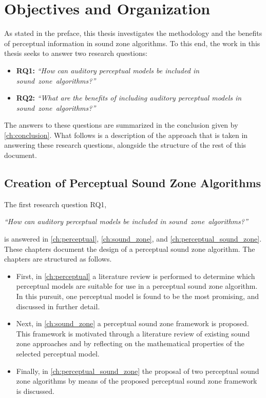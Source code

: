 \section{Objectives and Organization}
\label{ch:introduction:objectives}
As stated in the preface, this thesis investigates the methodology and 
the benefits of perceptual information in sound zone algorithms.
To this end, the work in this thesis seeks to answer two research questions:
\begin{itemize}
    \item \textbf{RQ1:} {\textit{``How can auditory perceptual models be included in sound~zone~algorithms?''}}
    \item \textbf{RQ2:} {\textit{``What are the benefits of including auditory perceptual models in sound~zone~algorithms?''}}
\end{itemize}

The answers to these questions are summarized in the conclusion given by \autoref{ch:conclusion}. 
What follows is a description of the approach that is taken in answering these research questions, 
alongside the structure of the rest of this document.

\subsection{Creation of Perceptual Sound Zone Algorithms}
The first research question RQ1, 

\begin{center}
    {\textit{``How can auditory perceptual models be included in sound~zone~algorithms?''}}
\end{center}

is answered in \autoref{ch:perceptual}, \autoref{ch:sound_zone}, and \autoref{ch:perceptual_sound_zone}.
These chapters document the design of a perceptual sound zone algorithm.
The chapters are structured as follows.
\begin{itemize}
    \item First, in \autoref{ch:perceptual} a literature review is performed to determine which perceptual models are 
        suitable for use in a perceptual sound zone algorithm.
        In this pursuit, one perceptual model is found to be the most promising, and discussed in further detail.
    \item Next, in \autoref{ch:sound_zone} a perceptual sound zone framework is proposed.
        This framework is motivated through a literature review of existing sound zone approaches 
        and by reflecting on the mathematical properties of the selected perceptual model.
    \item Finally, in \autoref{ch:perceptual_sound_zone} the proposal of two perceptual sound zone algorithms 
        by means of the proposed perceptual sound zone framework is discussed.
\end{itemize}

